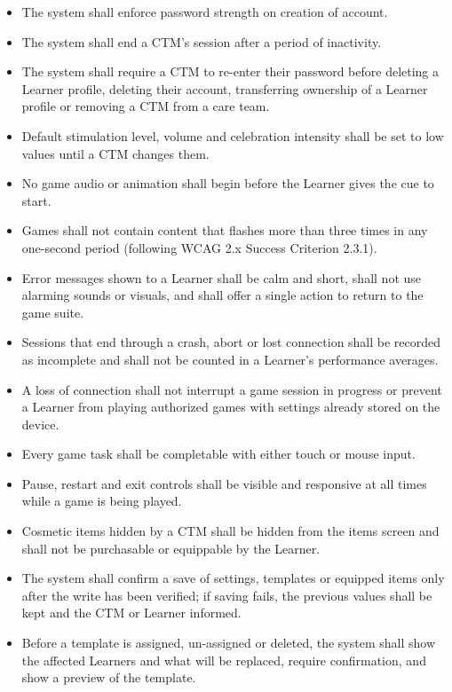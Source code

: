 \documentclass{article}
\begin{document}
\begin{itemize}
    \item[\textbf{SR-1}] The system shall enforce password strength on creation of account. 
    \item[\textbf{SR-2.}] The system shall end a CTM's session after a period of inactivity.
    \item[\textbf{SR-3.}] The system shall require a CTM to re-enter their password before deleting a Learner profile, deleting their account, transferring ownership of a Learner profile or removing a CTM from a care team.
    \item[\textbf{SR-4.}] Default stimulation level, volume and celebration intensity shall be set to low values until a CTM changes them.
    \item[\textbf{SR-5.}] No game audio or animation shall begin before the Learner gives the cue to start.
    \item[\textbf{SR-6.}] Games shall not contain content that flashes more than three times in any one-second period (following WCAG 2.x Success Criterion 2.3.1).
    \item[\textbf{SR-7.}] Error messages shown to a Learner shall be calm and short, shall not use alarming sounds or visuals, and shall offer a single action to return to the game suite.
    \item[\textbf{SR-8.}] Sessions that end through a crash, abort or lost connection shall be recorded as incomplete and shall not be counted in a Learner's performance averages.
    \item[\textbf{SR-9.}] A loss of connection shall not interrupt a game session in progress or prevent a Learner from playing authorized games with settings already stored on the device.
    \item[\textbf{SR-10.}] Every game task shall be completable with either touch or mouse input.
    \item[\textbf{SR-11.}] Pause, restart and exit controls shall be visible and responsive at all times while a game is being played.
    \item[\textbf{SR-12.}] Cosmetic items hidden by a CTM shall be hidden from the items screen and shall not be purchasable or equippable by the Learner.
    \item[\textbf{SR-13.}] The system shall confirm a save of settings, templates or equipped items only after the write has been verified; if saving fails, the previous values shall be kept and the CTM or Learner informed.
    \item[\textbf{SR-14.}] Before a template is assigned, un-assigned or deleted, the system shall show the affected Learners and what will be replaced, require confirmation, and show a preview of the template.

\end{itemize}
\end{document}
